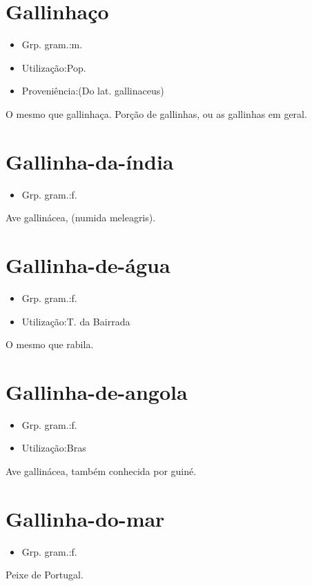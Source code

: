 \section{Gallinhaço}
\begin{itemize}
\item {Grp. gram.:m.}
\end{itemize}
\begin{itemize}
\item {Utilização:Pop.}
\end{itemize}
\begin{itemize}
\item {Proveniência:(Do lat. \textunderscore gallinaceus\textunderscore )}
\end{itemize}
O mesmo que \textunderscore gallinhaça\textunderscore .
Porção de gallinhas, ou as gallinhas em geral.
\section{Gallinha-da-índia}
\begin{itemize}
\item {Grp. gram.:f.}
\end{itemize}
Ave gallinácea, (\textunderscore numida meleagris\textunderscore ).
\section{Gallinha-de-água}
\begin{itemize}
\item {Grp. gram.:f.}
\end{itemize}
\begin{itemize}
\item {Utilização:T. da Bairrada}
\end{itemize}
O mesmo que \textunderscore rabila\textunderscore .
\section{Gallinha-de-angola}
\begin{itemize}
\item {Grp. gram.:f.}
\end{itemize}
\begin{itemize}
\item {Utilização:Bras}
\end{itemize}
Ave gallinácea, também conhecida por \textunderscore guiné\textunderscore .
\section{Gallinha-do-mar}
\begin{itemize}
\item {Grp. gram.:f.}
\end{itemize}
Peixe de Portugal.
